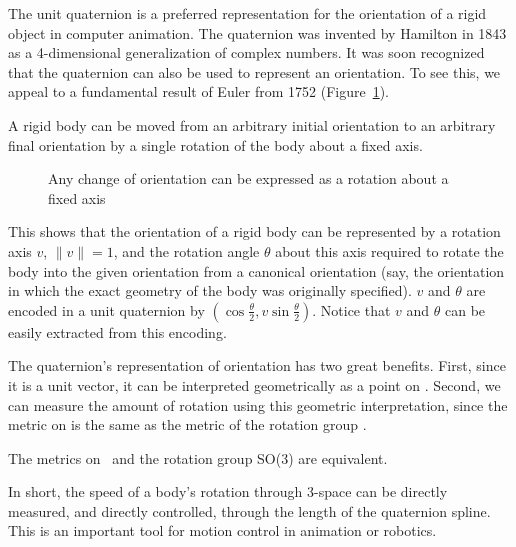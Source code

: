 The unit quaternion is a preferred representation for the
orientation of a rigid object in computer animation.
The quaternion was invented by Hamilton in 1843
as a 4-dimensional generalization of complex numbers.
It was soon recognized that the quaternion can also be used
to represent an orientation.
To see this, we appeal to a fundamental result of Euler from 1752
\cite{goldstein50} (Figure~\ref{fig:eulerRotation}).	
\begin{theorem}[Euler]
A rigid body can be moved from an arbitrary initial orientation
to an arbitrary final orientation by a single rotation of the body
about a fixed axis.
\end{theorem}
%
\begin{figure}
\vspace{2.5in}
\caption{Any change of orientation can be expressed as a rotation about a fixed axis}
\label{fig:eulerRotation}
\end{figure}
%
This shows that the orientation of a rigid body can be represented by 
a rotation axis $v$, $\|v\|=1$, and the rotation angle $\theta$ about 
this axis required to rotate the body into the given orientation from a
canonical orientation (say, the orientation in which the exact geometry
of the body was originally specified).
$v$ and $\theta$ are encoded in a unit quaternion by
$(\cos \frac{\theta}{2}, v \sin \frac{\theta}{2})$.
Notice that $v$ and $\theta$ can be easily extracted from this encoding.

The quaternion's representation of orientation has two great benefits.
First, since it is a unit vector, it can be interpreted geometrically
as a point on .
Second, we can measure the amount of rotation using this geometric
interpretation, since the metric on 
is the same as the metric of the rotation group \cite{misner73}.
%
\begin{theorem}
\label{thm:metric}
The metrics on \ and the rotation group SO(3) are equivalent.
\end{theorem}
%
In short, the speed of a body's rotation through 3-space
can be directly measured,
and directly controlled, through the length of the quaternion spline.
This is an important tool for motion control in animation or robotics.

